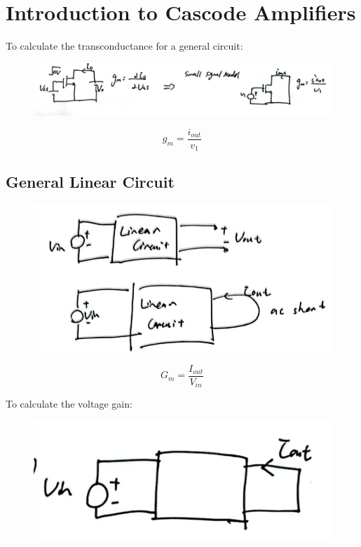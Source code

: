 \documentclass[fontset=windows]{article}
\begin{document}
\section*{Introduction to Cascode Amplifiers}

To calculate the transconductance for a general circuit: 

\begin{figure}[htbp]
    \centering
    \includegraphics[scale=0.6]{8.jpg}
    \captionsetup{labelformat=empty}
    \caption{}
    \label{8}
\end{figure}

$$g_m=\frac{i_{out}}{v_1}$$

\subsection*{General Linear Circuit}

\begin{figure}[htbp]
    \centering
    \includegraphics[scale=0.7]{9.jpg}
    \captionsetup{labelformat=empty}
    \caption{}
    \label{9}
\end{figure}

$$G_m=\frac{I_{out}}{V_{in}}$$

To calculate the voltage gain: 

\begin{figure}
    \centering
    \includegraphics[scale=0.9]{10.jpg}
    \captionsetup{labelformat=empty}
    \caption{}
    \label{10}
\end{figure}
\end{document}
